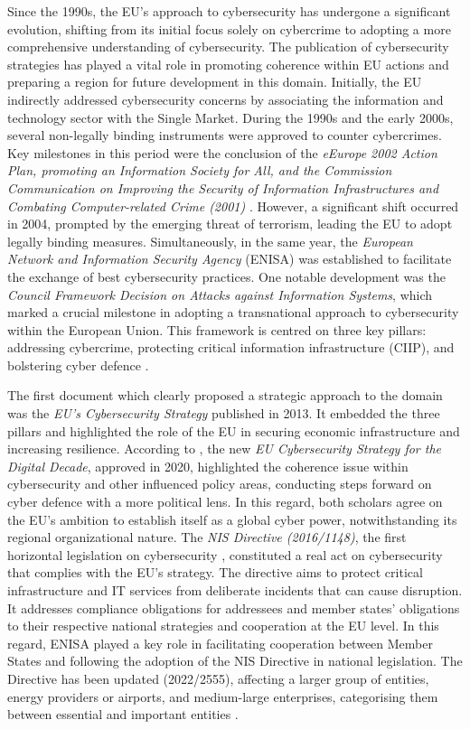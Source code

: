 Since the 1990s, the EU's approach to cybersecurity has undergone a significant evolution, shifting from its initial focus solely on cybercrime to adopting a more comprehensive understanding of cybersecurity. The publication of cybersecurity strategies has played a vital role in promoting coherence within EU actions and preparing a region for future development in this domain. Initially, the EU indirectly addressed cybersecurity concerns by associating the information and technology sector with the Single Market. During the 1990s and the early 2000s, several non-legally binding instruments were approved to counter cybercrimes. Key milestones in this period were the conclusion of the \textit{eEurope 2002 Action Plan, promoting an Information Society for All, and the Commission Communication on Improving the Security of Information Infrastructures and Combating Computer-related Crime (2001)} \autocite{carrapico_2017_the}. However, a significant shift occurred in 2004, prompted by the emerging threat of terrorism, leading the EU to adopt legally binding measures. Simultaneously, in the same year, the \textit{European Network and Information Security Agency} (ENISA) was established to facilitate the exchange of best cybersecurity practices. One notable development was the \textit{Council Framework Decision on Attacks against Information Systems}, which marked a crucial milestone in adopting a transnational approach to cybersecurity within the European Union. This framework is centred on three key pillars: addressing cybercrime, protecting critical information infrastructure (CIIP), and bolstering cyber defence \autocite{carrapico_2017_the}. 

The first document which clearly proposed a strategic approach to the domain was the \textit{EU’s Cybersecurity Strategy} published in 2013. It embedded the three pillars and highlighted the role of the EU in securing economic infrastructure and increasing resilience. According to \textcite{kasper_2021_the}, the new\textit{ EU Cybersecurity Strategy for the Digital Decade}, approved in 2020, highlighted the coherence issue within cybersecurity and other influenced policy areas, conducting steps forward on cyber defence with a more political lens. In this regard, both scholars agree on the EU's ambition to establish itself as a global cyber power, notwithstanding its regional organizational nature. The \textit{NIS Directive (2016/1148)}, the first horizontal legislation on cybersecurity \autocite{markopoulou_2019_the}, constituted a real act on cybersecurity that complies with the EU’s strategy. The directive aims to protect critical infrastructure and IT services from deliberate incidents that can cause disruption. It addresses compliance obligations for addressees and member states' obligations to their respective national strategies and cooperation at the EU level. In this regard, ENISA played a key role in facilitating cooperation between Member States and following the adoption of the NIS Directive in national legislation. The Directive has been updated (2022/2555), affecting a larger group of entities, energy providers or airports, and medium-large enterprises, categorising them between essential and important entities \autocite{enisa_2023_nis}. 

